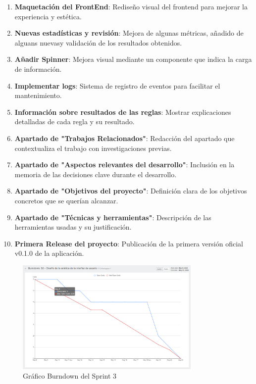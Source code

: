 \begin{enumerate}
\item \textbf{Maquetación del FrontEnd}: Rediseño visual del frontend para mejorar la experiencia y estética.
\item \textbf{Nuevas estadísticas y revisión}: Mejora de algunas métricas, añadido de alguans nuevasy validación de los resultados obtenidos.
\item \textbf{Añadir Spinner}: Mejora visual mediante un componente que indica la carga de información.
\item \textbf{Implementar logs}: Sistema de registro de eventos para facilitar el mantenimiento.
\item \textbf{Información sobre resultados de las reglas}: Mostrar explicaciones detalladas de cada regla y su resultado.
\item \textbf{Apartado de "Trabajos Relacionados"}: Redacción del apartado que contextualiza el trabajo con investigaciones previas.
\item \textbf{Apartado de "Aspectos relevantes del desarrollo"}: Inclusión en la memoria de las decisiones clave durante el desarrollo.
\item \textbf{Apartado de "Objetivos del proyecto"}: Definición clara de los objetivos concretos que se querían alcanzar.
\item \textbf{Apartado de "Técnicas y herramientas"}: Descripción de las herramientas usadas y su justificación.
\item \textbf{Primera Release del proyecto}: Publicación de la primera versión oficial v0.1.0 de la aplicación.
\end{enumerate}

\begin{figure}[H]
\centering
\includegraphics[width=0.8\textwidth]{img/BurndownS3.png}
\caption{Gráfico Burndown del Sprint 3}
\label{fig:BurndownS3}
\end{figure}

